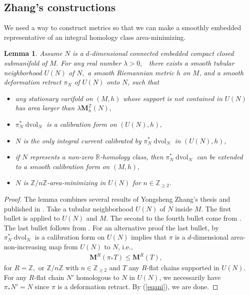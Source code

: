 \documentclass[11pt,a4paper]{amsart}
\numberwithin{equation}{section}
\newcommand{\lam}{\lambda}
\newcommand{\ms}{\mathbf{M}}
\newcommand{\dvol}{\operatorname{dvol}}
\newcommand{\du}{^\ast}
\newcommand{\pf}{_\ast}
\newcommand{\R}{\mathbb{R}}
\newcommand{\Z}{\mathbb{Z}}
\theoremstyle{plain}
\newtheorem{lem}{Lemma}[subsection]
\theoremstyle{definition}
\numberwithin{equation}{subsection}
\begin{document}
	\subsection{Zhang's constructions}We need a way to construct metrics so that we can make a smoothly embedded representative of an integral homology class area-minimizing.
	\begin{lem}\label{lemzhang}
	Assume $N$ is a $d$-dimensional connected embedded compact closed submanifold of $M$. For any real number $\lam>0,$  there exists a smooth tubular neighborhood $U(N)$ of $N,$ a smooth Riemannian metric $h$ on $M$, and a smooth deformation retract $\pi_N$ of $U(N)$ onto $N$, such that
	\begin{itemize}
		\item any stationary varifold on $(M,h)$ whose support is not contained in $U(N)$ has area larger than $\lam \ms_h^{\Z}(N),$
		\item $\pi_N\du \dvol_{N}$ is a calibration form on $(U(N),h),$
		\item $N$ is the only integral current calibrated by $\pi_N\du \dvol_{N}$ in $(U(N),h)$,
		\item if $N$ represents a non-zero $\R$-homology class, then $\pi_N\du \dvol_{N}$ can be extended to a smooth calibration form on $(M,h),$
		\item $N$ is $\Z/n\Z$-area-minimizing in $U(N)$ for $n\in \Z_{\ge2}$.
	\end{itemize}
	\end{lem}
	\begin{proof}
	The lemma combines several results of Yongsheng Zhang's thesis \cite{YZt} and published in \cite{YZj,YZa}. Take a tubular neighborhood $U(N)$ of $N$ inside $M.$
The first bullet is \cite[Lemma 3.1]{YZj} applied to $U(N)$ and $M$. The second to the fourth bullet come from \cite[Sections 3.3, 3.4]{YZa}. The last bullet follows from \cite[Lemma 2.12]{ZLa}. For an alternative proof the last bullet, by \cite[Fact 7.0.6]{ZLns} $\pi\du_N\dvol_N$ is a calibration form on $U(N)$ implies that $\pi$ is a $d$-dimensional area-non-increasing map from $U(N)$ to $N$, i.e., \begin{align}\label{eqani}
		\ms^R(\pi\pf T)\le \ms^R(T),
	\end{align} for $R=\Z,$ or $\Z/n\Z$ with $n\in\Z_{\ge2 }$ and $T$ any $R$-flat chains supported in $U(N).$ For any $R$-flat chain $N'$ homologous to $N$ in $U(N)$, we necessarily have $\pi\pf N'=N$ since $\pi$ is a deformation retract. By (\ref{eqani}), we are done.
	\end{proof}
\end{document}

